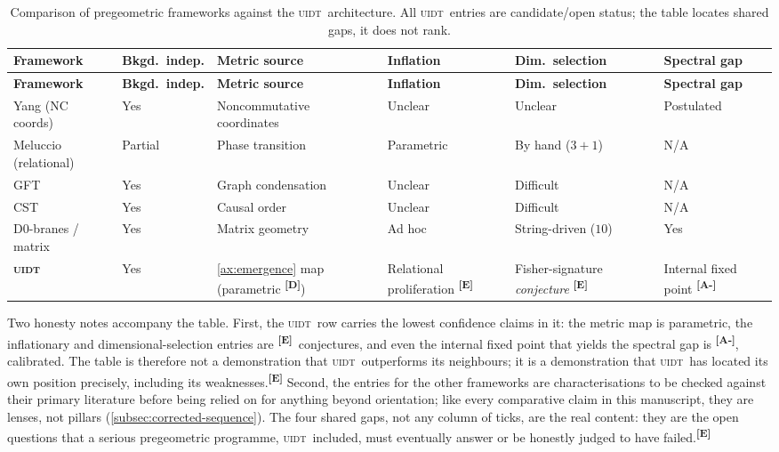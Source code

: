 \documentclass[12pt,a4paper,twoside]{article}
\theoremstyle{plain}
\theoremstyle{definition}
\theoremstyle{remark}
\newcommand{\UIDT}{\textsc{uidt}}
\newcommand{\catmark}[1]{\textsuperscript{\textsf{\textbf{[#1]}}}}
\begin{document}
{\small
\renewcommand{\arraystretch}{1.25}
\begin{longtable}{p{} p{} p{} p{} p{} p{}}
\caption{Comparison of pregeometric frameworks against the \UIDT\ architecture.
All \UIDT\ entries are candidate/open status; the table locates shared gaps, it
does not rank.}
\label{tab:pregeometric-comparison}\\
\toprule
\textbf{Framework} & \textbf{Bkgd.\ indep.} & \textbf{Metric source} & \textbf{Inflation} & \textbf{Dim.\ selection} & \textbf{Spectral gap} \\
\midrule
\endfirsthead
\toprule
\textbf{Framework} & \textbf{Bkgd.\ indep.} & \textbf{Metric source} & \textbf{Inflation} & \textbf{Dim.\ selection} & \textbf{Spectral gap} \\
\midrule
\endhead
\bottomrule
\endfoot
Yang (NC coords) & Yes & Noncommutative coordinates & Unclear & Unclear & Postulated \\
Meluccio (relational) & Partial & Phase transition & Parametric & By hand ($3{+}1$) & N/A \\
GFT & Yes & Graph condensation & Unclear & Difficult & N/A \\
CST & Yes & Causal order & Unclear & Difficult & N/A \\
D0-branes / matrix & Yes & Matrix geometry & Ad hoc & String-driven ($10$) & Yes \\
\midrule
\textbf{\UIDT} & Yes & \cref{ax:emergence} map (parametric \catmark{D}) & Relational proliferation \catmark{E} & Fisher-signature \emph{conjecture} \catmark{E} & Internal fixed point \catmark{A-} \\
\bottomrule
\end{longtable}
}

\noindent Two honesty notes accompany the table. First, the \UIDT\ row carries the lowest confidence claims in it: the metric map is parametric, the inflationary and dimensional-selection entries are \catmark{E}\ conjectures, and even the internal fixed point that yields the spectral gap is \catmark{A-}, calibrated. The table is therefore not a demonstration that \UIDT\ outperforms its neighbours; it is a demonstration that \UIDT\ has located its own position precisely, including its weaknesses.\catmark{E} Second, the entries for the other frameworks are characterisations to be checked against their primary literature before being relied on for anything beyond orientation; like every comparative claim in this manuscript, they are lenses, not pillars (\cref{subsec:corrected-sequence}). The four shared gaps, not any column of ticks, are the real content: they are the open questions that a serious pregeometric programme, \UIDT\ included, must eventually answer or be honestly judged to have failed.\catmark{E}
\end{document}
